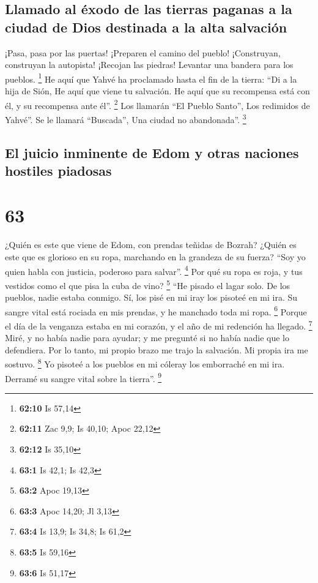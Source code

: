 \hypertarget{llamado-al-uxe9xodo-de-las-tierras-paganas-a-la-ciudad-de-dios-destinada-a-la-alta-salvaciuxf3n}{%
\subsection{Llamado al éxodo de las tierras paganas a la ciudad de Dios
destinada a la alta
salvación}\label{llamado-al-uxe9xodo-de-las-tierras-paganas-a-la-ciudad-de-dios-destinada-a-la-alta-salvaciuxf3n}}

 ¡Pasa, pasa por las puertas! ¡Preparen el camino del
pueblo! ¡Construyan, construyan la autopista! ¡Recojan las piedras!
Levantar una bandera para los pueblos. \footnote{\textbf{62:10} Is 57,14}
 He aquí que Yahvé ha proclamado hasta el fin de la
tierra: ``Di a la hija de Sión, He aquí que viene tu salvación. He aquí
que su recompensa está con él, y su recompensa ante él''. \footnote{\textbf{62:11}
  Zac 9,9; Is 40,10; Apoc 22,12}  Los llamarán ``El
Pueblo Santo'', Los redimidos de Yahvé''. Se le llamará ``Buscada'', Una
ciudad no abandonada''. \footnote{\textbf{62:12} Is 35,10}

\hypertarget{el-juicio-inminente-de-edom-y-otras-naciones-hostiles-piadosas}{%
\subsection{El juicio inminente de Edom y otras naciones hostiles
piadosas}\label{el-juicio-inminente-de-edom-y-otras-naciones-hostiles-piadosas}}

\hypertarget{section-62}{%
\section{63}\label{section-62}}

 ¿Quién es este que viene de Edom, con prendas teñidas de
Bozrah? ¿Quién es este que es glorioso en su ropa, marchando en la
grandeza de su fuerza? ``Soy yo quien habla con justicia, poderoso para
salvar''. \footnote{\textbf{63:1} Is 42,1; Is 42,3}  Por
qué su ropa es roja, y tus vestidos como el que pisa la cuba de vino?
\footnote{\textbf{63:2} Apoc 19,13}  ``He pisado el lagar
solo. De los pueblos, nadie estaba conmigo. Sí, los pisé en mi iray los
pisoteé en mi ira. Su sangre vital está rociada en mis prendas, y he
manchado toda mi ropa. \footnote{\textbf{63:3} Apoc 14,20; Jl 3,13}
 Porque el día de la venganza estaba en mi corazón, y el
año de mi redención ha llegado. \footnote{\textbf{63:4} Is 13,9; Is
  34,8; Is 61,2}  Miré, y no había nadie para ayudar; y me
pregunté si no había nadie que lo defendiera. Por lo tanto, mi propio
brazo me trajo la salvación. Mi propia ira me sostuvo. \footnote{\textbf{63:5}
  Is 59,16}  Yo pisoteé a los pueblos en mi cóleray los
emborraché en mi ira. Derramé su sangre vital sobre la tierra''.
\footnote{\textbf{63:6} Is 51,17}

